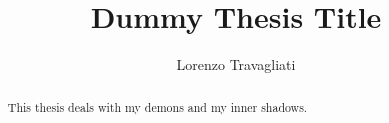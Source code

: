 \documentclass[LaM, twoside, english, noexaminfo]{sapthesis}
\title{Dummy Thesis Title}
\author{Lorenzo Travagliati}
\begin{document}
	
	\frontmatter
	\maketitle
	
	\dedication{Dedicated to\\ Satan}
	\begin{abstract}
	This thesis deals with my demons and my inner shadows.
	\end{abstract}
	
	\tableofcontents
	\mainmatter
	
	
	
	
	
	
\end{document}
